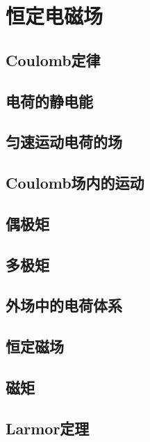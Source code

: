 \chapter{恒定电磁场}

\section{Coulomb定律}

\section{电荷的静电能}

\section{匀速运动电荷的场}

\section{Coulomb场内的运动}

\section{偶极矩}

\section{多极矩}

\section{外场中的电荷体系}

\section{恒定磁场}

\section{磁矩}

\section{Larmor定理}